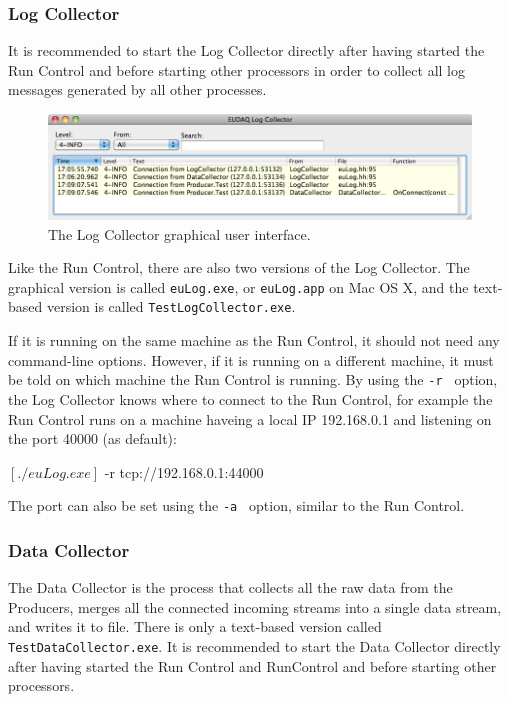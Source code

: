 \subsubsection{Log Collector}
\label{sec:logcollector}
It is recommended to start the Log Collector directly after having started the Run Control and before starting other processors in order to collect all log messages generated by all other processes.

\begin{figure}[htb]
  \begin{center}
    \includegraphics[width=\textwidth]{src/images/LogCollector}
    \caption{The Log Collector graphical user interface.}
    \label{fig:LogCollector}
  \end{center}
\end{figure}

Like the Run Control, there are also two versions of the Log Collector.
The graphical version is called \texttt{euLog.exe}, or \texttt{euLog.app} on Mac OS X,
and the text-based version is called \texttt{TestLogCollector.exe}.

If it is running on the same machine as the Run Control, it should not need any command-line options.
However, if it is running on a different machine, it must be told on which machine the Run Control is running.
By using the \texttt{-r } option, the Log Collector knows where to connect to the Run Control, for example the Run Control runs on a machine haveing a local IP 192.168.0.1 and listening on the port 40000 (as default):
\begin{listing}[mybash]
$[./euLog.exe]$ -r tcp://192.168.0.1:44000
\end{listing}
The port can also be set using the \texttt{-a } option, similar to the Run Control.

\subsubsection{Data Collector}
\label{sec:datacollector}
The Data Collector is the process that collects all the raw data from the Producers,
merges all the connected incoming streams into a single data stream, and writes it to file.
There is only a text-based version called \texttt{TestDataCollector.exe}.
It is recommended to start the Data Collector directly after having started the Run Control and RunControl and before starting other processors.

